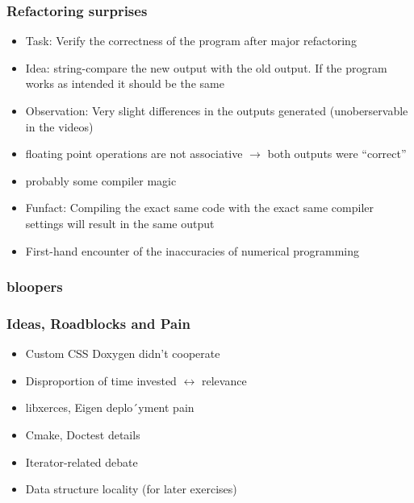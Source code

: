 \begin{frame}
    \frametitle{Refactoring surprises}
		\large
		\begin{itemize}
			\item<1-> Task: Verify the correctness of the program after major refactoring
			\item<2-> Idea: string-compare the new output with the old output. If the program works as intended it should be the same
			\item<3-> Observation: Very slight differences in the outputs generated (unoberservable in the videos)
		\end{itemize}
		\begin{itemize}
			\item<5-> floating point operations are not associative $\rightarrow$ both outputs were "`correct"'
			\item<6-> probably some compiler magic
			\item<7-> Funfact: Compiling the exact same code with the exact same compiler settings will result in the same output
			\item<8-> First-hand encounter of the inaccuracies of numerical programming
		\end{itemize}

\end{frame}
\clearpage

\begin{frame}
	\frametitle{bloopers}
\end{frame}

\begin{frame}
	\frametitle{Ideas, Roadblocks and Pain}
	\large
	\begin{itemize}
		\item<1-> Custom CSS Doxygen didn't cooperate
		\item<2-> Disproportion of time invested $\leftrightarrow$ relevance
		\item<3-> libxerces, Eigen deplo´yment pain
		\item<4-> Cmake, Doctest details
		\item<5-> Iterator-related debate
		\item<6-> Data structure locality (for later exercises)
	\end{itemize}
	
\end{frame}